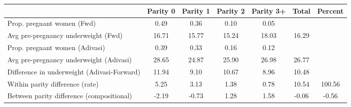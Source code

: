 \begin{tabular}{l*{6}{c}}
\toprule
            &\multicolumn{1}{c}{Parity 0}&\multicolumn{1}{c}{Parity 1}&\multicolumn{1}{c}{Parity 2}&\multicolumn{1}{c}{Parity 3+}&\multicolumn{1}{c}{Total}&\multicolumn{1}{c}{Percent}\\
\midrule
\midrule
Prop. pregnant women (Fwd)&        0.49&        0.36&        0.10&        0.05&            &            \\
Avg pre-pregnancy underweight (Fwd)&       16.71&       15.77&       15.24&       18.03&       16.29&            \\
Prop. pregnant women (Adivasi)&        0.39&        0.33&        0.16&        0.12&            &            \\
Avg pre-pregnancy underweight (Adivasi)&       28.65&       24.87&       25.90&       26.98&       26.77&            \\
Difference in underweight (Adivasi-Forward)&       11.94&        9.10&       10.67&        8.96&       10.48&            \\
Within parity difference (rate)&        5.25&        3.13&        1.38&        0.78&       10.54&      100.56\\
Between parity difference (compositional)&       -2.19&       -0.73&        1.28&        1.58&       -0.06&       -0.56\\
\bottomrule
\end{tabular}
